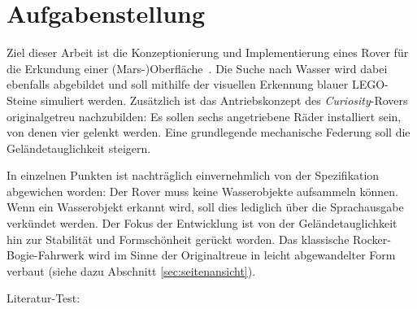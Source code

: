 \section{Aufgabenstellung}
\label{sec:aufgabe}

Ziel dieser Arbeit ist die \glqq Konzeptionierung und Implementierung eines Rover für die Erkundung einer (Mars-)Oberfläche\grqq\ \cite{mueller2019}.
Die Suche nach Wasser wird dabei ebenfalls abgebildet und soll mithilfe der visuellen Erkennung blauer LEGO-Steine simuliert werden.
Zusätzlich ist das Antriebskonzept des \textit{Curiosity}-Rovers originalgetreu nachzubilden: Es sollen sechs angetriebene Räder installiert sein, von denen vier gelenkt werden.
Eine grundlegende mechanische Federung soll die Geländetauglichkeit steigern.

In einzelnen Punkten ist nachträglich einvernehmlich von der Spezifikation abgewichen worden:
Der Rover muss keine Wasserobjekte aufsammeln können.
Wenn ein Wasserobjekt erkannt wird, soll dies lediglich über die Sprachausgabe verkündet werden.
Der Fokus der Entwicklung ist von der Geländetauglichkeit hin zur Stabilität und Formschönheit gerückt worden.
Das klassische Rocker-Bogie-Fahrwerk wird im Sinne der Originaltreue in leicht abgewandelter Form verbaut (siehe dazu Abschnitt \ref{sec:seitenansicht}).

Literatur-Test:
\cite{yamanoor2017}
\cite{horan2013}
\cite{donat2018}
\cite{halfacree2019}
\cite{mcmanus2017}
\cite{cox2014}